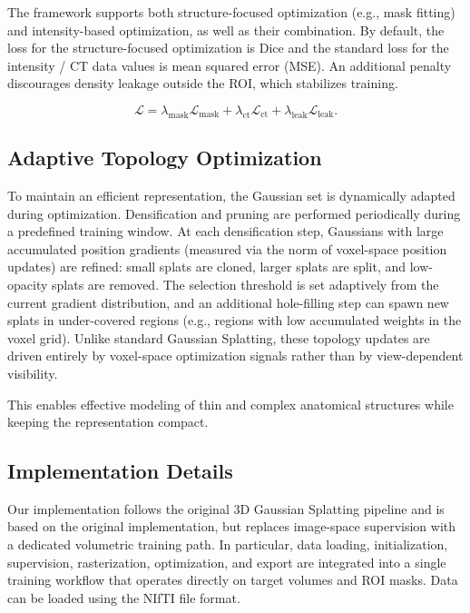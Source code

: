 \documentclass[runningheads]{llncs}
\begin{document}
The framework supports both structure-focused optimization (e.g., mask fitting) and intensity-based optimization, as well as their combination. By default, the loss for the structure-focused optimization is Dice and the standard loss for the intensity / CT data values is mean squared error (MSE). An additional penalty discourages density leakage outside the ROI, which stabilizes training.

\begin{equation}
\mathcal{L} = \lambda_{\mathrm{mask}} \mathcal{L}_{\mathrm{mask}} + \lambda_{\mathrm{ct}} \mathcal{L}_{\mathrm{ct}} + \lambda_{\mathrm{leak}} \mathcal{L}_{\mathrm{leak}}.
\end{equation}

\subsection{Adaptive Topology Optimization}
To maintain an efficient representation, the Gaussian set is dynamically adapted during optimization. Densification and pruning are performed periodically during a predefined training window. At each densification step, Gaussians with large accumulated position gradients (measured via the norm of voxel-space position updates) are refined: small splats are cloned, larger splats are split, and low-opacity splats are removed. The selection threshold is set adaptively from the current gradient distribution, and an additional hole-filling step can spawn new splats in under-covered regions (e.g., regions with low accumulated weights in the voxel grid). Unlike standard Gaussian Splatting, these topology updates are driven entirely by voxel-space optimization signals rather than by view-dependent visibility.

This enables effective modeling of thin and complex anatomical structures while keeping the representation compact.

\subsection{Implementation Details}
Our implementation follows the original 3D Gaussian Splatting pipeline \cite{kerbl2023gaussiansplatting} and is based on the original implementation, but replaces image-space supervision with a dedicated volumetric training path. In particular, data loading, initialization, supervision, rasterization, optimization, and export are integrated into a single training workflow that operates directly on target volumes and ROI masks. Data can be loaded using the NIfTI file format.
\end{document}
